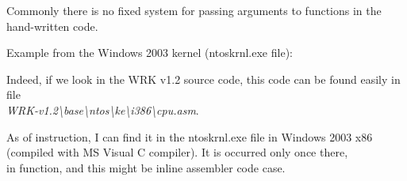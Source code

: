 \par
Commonly there is no fixed system for passing arguments to functions in the hand-written code.

\par
Example from the Windows 2003 kernel 
(ntoskrnl.exe file):



Indeed, if we look in the 
\ac{WRK} v1.2 source code, this code
can be found easily in file \\
\emph{WRK-v1.2\textbackslash{}base\textbackslash{}ntos\textbackslash{}ke\textbackslash{}i386\textbackslash{}cpu.asm}.

\par 
As of  instruction, I can find it in the ntoskrnl.exe file in Windows 2003 x86 (compiled with MS Visual C compiler).
It is occurred only once there, \\
in  function, and this might be inline assembler code case.

